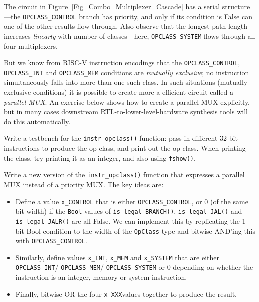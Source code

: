 The circuit in Figure~\ref{Fig_Combo_Multiplexer_Cascade} has a serial
structure---the \verb|OPCLASS_CONTROL| branch has priority, and only
if its condition is False can one of the other results flow through.
Also observe that the longest path length increases \emph{linearly}
with number of classes---here, \verb|OPCLASS_SYSTEM| flows through all
four multiplexers.

But we know from RISC-V instruction encodings that the
\verb|OPCLASS_CONTROL|, \verb|OPCLASS_INT| and \verb|OPCLASS_MEM|
conditions are \emph{mutually exclusive}; no instruction
simultaneously falls into more than one such class.  In such
situations (mutually exclusive conditions) it is possible to create
more a efficient circuit called a \emph{parallel MUX}.  An exercise
below shows how to create a parallel MUX explicitly, but in many cases
downstream RTL-to-lower-level-hardware synthesis tools will do this
automatically.


\hdivider

\Exercise

Write a testbench for the \verb|instr_opclass()| function: pass in
different 32-bit instructions to produce the op class, and print out
the op class.  When printing the class, try printing it as an integer,
and also using \verb|fshow()|.

\Exercise

Write a new version of the \verb|instr_opclass()| function that
expresses a parallel MUX instead of a priority MUX.  The key ideas
are:

  \begin{itemize}

    \item Define a value \verb|x_CONTROL| that is either
      \verb|OPCLASS_CONTROL|, or 0 (of the same bit-width) if the
      \verb|Bool| values of \verb|is_legal_BRANCH()|,
      \verb|is_legal_JAL()| and \verb|is_legal_JALR()| are all False.
      We can implement this by replicating the 1-bit Bool condition to
      the width of the \verb|OpClass| type and bitwise-AND'ing this
      with \verb|OPCLASS_CONTROL|.

    \item Similarly, define values \verb|x_INT|, \verb|x_MEM| and
       \verb|x_SYSTEM| that are either \verb|OPCLASS_INT|/
       \verb|OPCLASS_MEM|/ \verb|OPCLASS_SYSTEM| or 0 depending on
       whether the instruction is an integer, memory or system
       instruction.

    \item Finally, bitwise-OR the four \verb|x_XXX|values
      together to produce the result.

  \end{itemize}

